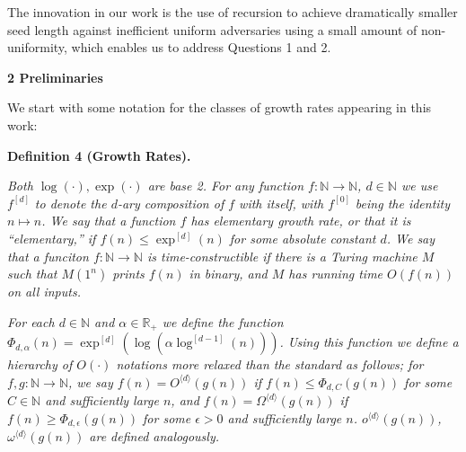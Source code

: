 \documentclass[10pt,a4paper]{article}
\begin{document}
The innovation in our work is the use of recursion to achieve dramatically smaller seed length against inefficient uniform adversaries using a small amount of non-uniformity, which enables us to address Questions 1 and 2.\par






\par\medskip\noindent\textbf{
2 Preliminaries}\par




We start with some notation for the classes of growth rates appearing in this work:\par





\par\medskip\noindent\textbf{
\textbf{Definition 4}\textbf{ }(Growth Rates)\textbf{.}
}\par



\emph{Both $\log(\cdot),\exp(\cdot)$ are base 2. For any function $f:\mathbb{N}\to\mathbb{N}$, $d\in\mathbb{N}$ we use $f^{[d]}$ to denote the $d$-ary composition of $f$ with itself, with $f^{[0]}$ being the identity $n\mapsto n$. We say that a function $f$ has elementary growth rate, or that it is “elementary,” if $f(n)\leq\exp^{[d]}(n)$ for some absolute constant $d$. We say that a funciton $f:\mathbb{N}\to\mathbb{N}$ is time-constructible if there is a Turing machine $M$ such that $M(1^{n})$ prints $f(n)$ in binary, and $M$ has running time $O(f(n))$ on all inputs.}\par




\emph{For each $d\in\mathbb{N}$ and $\alpha\in\mathbb{R}_{+}$ we define the function $\Phi_{d,\alpha}(n)=\exp^{[d]}(\log(\alpha\log^{[d-1]}(n)))$.
Using this function we define a hierarchy of $O(\cdot)$ notations more relaxed than the standard as follows; for $f,g:\mathbb{N}\to\mathbb{N}$, we say $f(n)=O^{\langle d\rangle}(g(n))$ if $f(n)\leq\Phi_{d,C}(g(n))$ for some $C\in\mathbb{N}$ and sufficiently large $n$, and $f(n)=\Omega^{\langle d\rangle}(g(n))$ if $f(n)\geq\Phi_{d,\epsilon}(g(n))$ for some $\epsilon>0$ and sufficiently large $n$. $o^{\langle d\rangle}(g(n))$, $\omega^{\langle d\rangle}(g(n))$ are defined analogously.}\par
\end{document}
